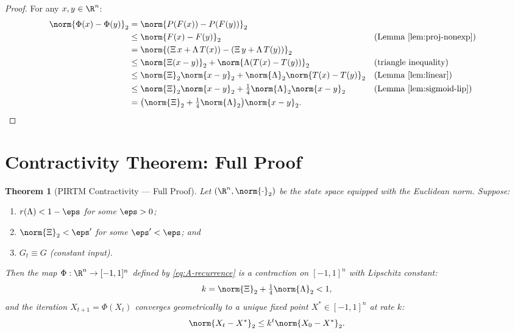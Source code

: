 \documentclass[11pt,letterpaper]{article}
\newtheorem{theorem}{Theorem}[section]
\theoremstyle{remark}
\begin{document}
\begin{proof}
For any $x, y \in \R^n$:
\begin{align*}
  \norm{\Phi(x) - \Phi(y)}_2
  &= \norm{P(F(x)) - P(F(y))}_2 \\
  &\leq \norm{F(x) - F(y)}_2
    && \text{(Lemma~\ref{lem:proj-nonexp})} \\
  &= \norm{(\Xi\,x + \Lambda\,T(x)) - (\Xi\,y + \Lambda\,T(y))}_2 \\
  &\leq \norm{\Xi(x-y)}_2 + \norm{\Lambda(T(x)-T(y))}_2
    && \text{(triangle inequality)} \\
  &\leq \norm{\Xi}_2\norm{x-y}_2 + \norm{\Lambda}_2\norm{T(x)-T(y)}_2
    && \text{(Lemma~\ref{lem:linear})} \\
  &\leq \norm{\Xi}_2\norm{x-y}_2 + \tfrac{1}{4}\norm{\Lambda}_2\norm{x-y}_2
    && \text{(Lemma~\ref{lem:sigmoid-lip})} \\
  &= \bigl(\norm{\Xi}_2 + \tfrac{1}{4}\norm{\Lambda}_2\bigr)\norm{x-y}_2. \qedhere
\end{align*}
\end{proof}

\section{Contractivity Theorem: Full Proof}
\label{sec:contractivity}

\begin{theorem}[PIRTM Contractivity --- Full Proof]
\label{thm:A-contractivity}
Let $(\R^n, \norm{\cdot}_2)$ be the state space equipped with the
Euclidean norm. Suppose:
\begin{enumerate}[label=(\roman*)]
  \item $r(\Lambda) < 1 - \eps$ for some $\eps > 0$;
  \item $\norm{\Xi}_2 < \eps'$ for some $\eps' < \eps$; and
  \item $G_t \equiv G$ (constant input).
\end{enumerate}
Then the map $\Phi : \R^n \to [-1,1]^n$ defined by \eqref{eq:A-recurrence}
is a contraction on $[-1,1]^n$ with Lipschitz constant:
\[
  k = \norm{\Xi}_2 + \tfrac{1}{4}\norm{\Lambda}_2 < 1,
\]
and the iteration $X_{t+1} = \Phi(X_t)$ converges geometrically to
a unique fixed point $X^* \in [-1,1]^n$ at rate $k$:
\[
  \norm{X_t - X^*}_2 \leq k^t \norm{X_0 - X^*}_2.
\]
\end{theorem}
\end{document}
